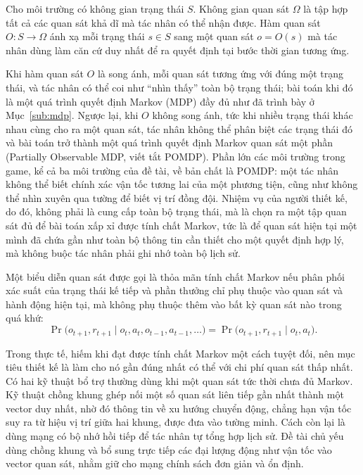 \begin{dn}
\label{dn:obs}
Cho môi trường có không gian trạng thái $S$. Không gian quan sát $\Omega$ là tập hợp
tất cả các quan sát khả dĩ mà tác nhân có thể nhận được. Hàm quan sát
$O: S \to \Omega$ ánh xạ mỗi trạng thái $s \in S$ sang một quan sát $o = O(s)$ mà tác
nhân dùng làm căn cứ duy nhất để ra quyết định tại bước thời gian tương ứng.
\end{dn}

\indent Khi hàm quan sát $O$ là song ánh, mỗi quan sát tương ứng với đúng một trạng
thái, và tác nhân có thể coi như ``nhìn thấy'' toàn bộ trạng thái; bài toán khi đó là
một quá trình quyết định Markov (MDP) đầy đủ như đã trình bày ở Mục~\ref{sub:mdp}.
Ngược lại, khi $O$ không song ánh, tức khi nhiều trạng thái khác nhau cùng cho ra một
quan sát, tác nhân không thể phân biệt các trạng thái đó và bài toán trở thành một
quá trình quyết định Markov quan sát một phần (Partially Observable MDP, viết
tắt POMDP). Phần lớn các môi trường trong game, kể cả ba môi trường của đề tài, về bản
chất là POMDP: một tác nhân không thể biết chính xác vận tốc tương lai của một phương
tiện, cũng như không thể nhìn xuyên qua tường để biết vị trí đồng đội. Nhiệm vụ của
người thiết kế, do đó, không phải là cung cấp toàn bộ trạng thái, mà là chọn ra một
tập quan sát đủ để bài toán xấp xỉ được tính chất Markov, tức là để quan sát
hiện tại một mình đã chứa gần như toàn bộ thông tin cần thiết cho một quyết định hợp
lý, mà không buộc tác nhân phải ghi nhớ toàn bộ lịch sử.

\begin{dn}
\label{dn:markov-obs}
Một biểu diễn quan sát được gọi là thỏa mãn tính chất Markov nếu phân phối xác suất
của trạng thái kế tiếp và phần thưởng chỉ phụ thuộc vào quan sát và hành động hiện tại,
mà không phụ thuộc thêm vào bất kỳ quan sát nào trong quá khứ:
\[
\Pr\bigl(o_{t+1}, r_{t+1} \mid o_t, a_t, o_{t-1}, a_{t-1}, \dots\bigr)
= \Pr\bigl(o_{t+1}, r_{t+1} \mid o_t, a_t\bigr).
\]
\end{dn}

\indent Trong thực tế, hiếm khi đạt được tính chất Markov một cách tuyệt đối, nên mục
tiêu thiết kế là làm cho nó gần đúng nhất có thể với chi phí quan sát thấp nhất.
Có hai kỹ thuật bổ trợ thường dùng khi một quan sát tức thời chưa đủ Markov. Kỹ thuật
chồng khung ghép nối một số quan sát liên tiếp gần nhất thành một vector duy
nhất, nhờ đó thông tin về xu hướng chuyển động, chẳng hạn vận tốc suy ra từ hiệu vị trí
giữa hai khung, được đưa vào tường minh. Cách còn lại là dùng mạng có bộ nhớ hồi tiếp để
tác nhân tự tổng hợp lịch sử. Đề tài chủ yếu dùng chồng khung và bổ sung trực tiếp các
đại lượng động như vận tốc vào vector quan sát, nhằm giữ cho mạng chính sách đơn giản và
ổn định.


